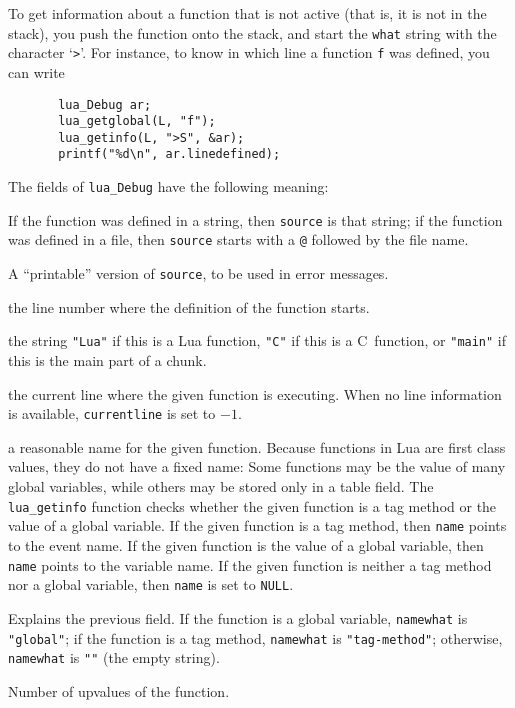 \documentclass[11pt,twoside,draft]{article}
\newcommand{\Math}[1]{$#1$}
\begin{document}
To get information about a function that is not active (that is,
it is not in the stack),
you push the function onto the stack,
and start the \verb|what| string with the character `\verb|>|'.
For instance, to know in which line a function \verb|f| was defined,
you can write
\begin{verbatim}
       lua_Debug ar;
       lua_getglobal(L, "f");
       lua_getinfo(L, ">S", &ar);
       printf("%d\n", ar.linedefined);
\end{verbatim}
The fields of \verb|lua_Debug| have the following meaning:
\begin{description}\leftskip=20pt

\item[source]
If the function was defined in a string,
then \verb|source| is that string;
if the function was defined in a file,
then \verb|source| starts with a \verb|@| followed by the file name.

\item[short\_src]
A ``printable'' version of \verb|source|, to be used in error messages.

\item[linedefined]
the line number where the definition of the function starts.

\item[what] the string \verb|"Lua"| if this is a Lua function,
\verb|"C"| if this is a C~function,
or \verb|"main"| if this is the main part of a chunk.

\item[currentline]
the current line where the given function is executing.
When no line information is available,
\verb|currentline| is set to \Math{-1}.

\item[name]
a reasonable name for the given function.
Because functions in Lua are first class values,
they do not have a fixed name:
Some functions may be the value of many global variables,
while others may be stored only in a table field.
The \verb|lua_getinfo| function checks whether the given
function is a tag method or the value of a global variable.
If the given function is a tag method,
then \verb|name| points to the event name.
If the given function is the value of a global variable,
then \verb|name| points to the variable name.
If the given function is neither a tag method nor a global variable,
then \verb|name| is set to \verb|NULL|.

\item[namewhat]
Explains the previous field.
If the function is a global variable,
\verb|namewhat| is \verb|"global"|;
if the function is a tag method,
\verb|namewhat| is \verb|"tag-method"|;
otherwise, \verb|namewhat| is \verb|""| (the empty string).

\item[nups]
Number of upvalues of the function.

\end{description}
\end{document}
